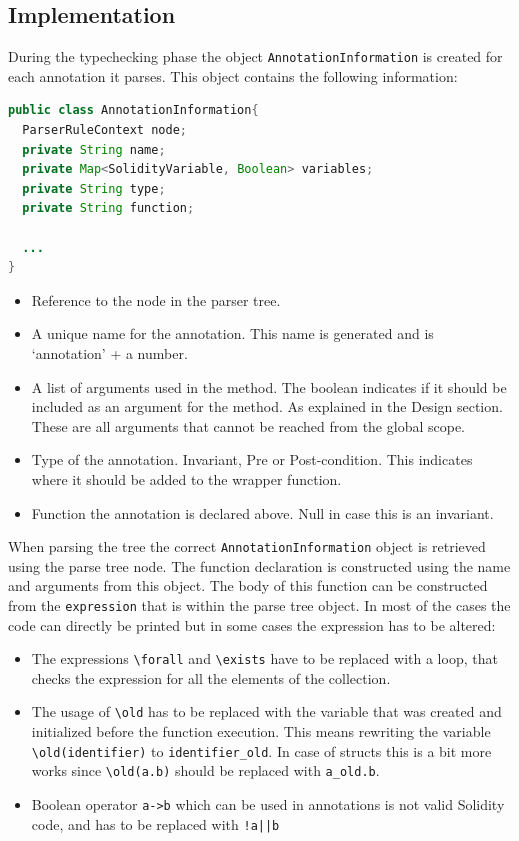 \documentclass[a4paper]{article}
\begin{document}
\subsection{Implementation}
During the typechecking phase the object \texttt{AnnotationInformation} is created for each annotation it parses. This object contains the following information:
\begin{lstlisting}[breaklines=true, language=Java ]
public class AnnotationInformation{  
  ParserRuleContext node;
  private String name;
  private Map<SolidityVariable, Boolean> variables;
  private String type;
  private String function;

  ...
}
\end{lstlisting}
\begin{itemize}
  \item Reference to the node in the parser tree.
  \item A unique name for the annotation. This name is generated and is `annotation' + a number.
  \item A list of arguments used in the method. The boolean indicates if it should be included as an argument for the method. As explained in the Design section. These are all arguments that cannot be reached from the global scope.
  \item Type of the annotation. Invariant, Pre or Post-condition. This indicates where it should be added to the wrapper function.
  \item Function the annotation is declared above. Null in case this is an invariant.
\end{itemize}
When parsing the tree the correct \texttt{AnnotationInformation} object is retrieved using the parse tree node. The function declaration is constructed using the name and arguments from this object. The body of this function can be constructed from the \texttt{expression} that is within the parse tree object. In most of the cases the code can directly be printed but in some cases the expression has to be altered:
\begin{itemize}
  \item The expressions \texttt{\textbackslash forall} and \texttt{\textbackslash exists} have to be replaced with a loop, that checks the expression for all the elements of the collection. 
  \item The usage of \texttt{\textbackslash old} has to be replaced with the variable that was created and initialized before the function execution. This means rewriting the variable \texttt{\textbackslash old(identifier)} to \texttt{identifier\_old}. In case of structs this is a bit more works since \texttt{\textbackslash old(a.b)} should be replaced with \texttt{a\_old.b}.
  \item Boolean operator \texttt{a->b} which can be used in annotations is not valid Solidity code, and has to be replaced with \texttt{!a||b}
\end{itemize}
\end{document}
